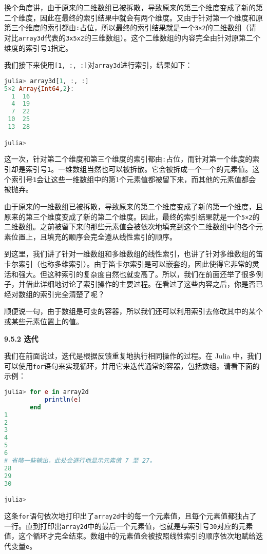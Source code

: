 换个角度讲，由于原来的二维数组已被拆散，导致原来的第三个维度变成了新的第二个维度，因此在最终的索引结果中就会有两个维度。又由于针对第一个维度和原第三个维度的索引都由\verb|:|占位，所以最终的索引结果就是一个\verb|3×2|的二维数组（请对比\verb|array3d|代表的\verb|3x5x2|的三维数组）。这个二维数组的内容完全由针对原第二个维度的索引号\verb|1|指定。

我们接下来使用\verb|[1, :, :]|对\verb|array3d|进行索引，结果如下：

\begin{lstlisting}[language=julia]
julia> array3d[1, :, :]
5×2 Array{Int64,2}:
  1  16
  4  19
  7  22
 10  25
 13  28

julia> 
\end{lstlisting}

这一次，针对第二个维度和第三个维度的索引都由\verb|:|占位，而针对第一个维度的索引却是索引号\verb|1|。一维数组当然也可以被拆散。它会被拆成一个一个的元素值。这个索引号\verb|1|会让这些一维数组中的第1个元素值都被留下来，而其他的元素值都会被抛弃。

由于原来的一维数组已被拆散，导致原来的第二个维度变成了新的第一个维度，且原来的第三个维度变成了新的第二个维度。因此，最终的索引结果就是一个\verb|5×2|的二维数组。之前被留下来的那些元素值会被依次地填充到这个二维数组中的各个元素位置上，且填充的顺序会完全遵从线性索引的顺序。

到这里，我们讲了针对一维数组和多维数组的线性索引，也讲了针对多维数组的笛卡尔索引（也称多维索引）。由于笛卡尔索引是可以嵌套的，因此使得它非常的灵活和强大。但这种索引的复杂度自然也就变高了。所以，我们在前面还举了很多例子，并借此详细地讨论了索引操作的主要过程。在看过了这些内容之后，你是否已经对数组的索引完全清楚了呢？

顺便说一句，由于数组是可变的容器，所以我们还可以利用索引去修改其中的某个或某些元素位置上的值。

\textbf{9.5.2 迭代}

我们在前面说过，迭代是根据反馈重复地执行相同操作的过程。在 Julia 中，我们可以使用\verb|for|语句来实现循环，并用它来迭代通常的容器，包括数组。请看下面的示例：

\begin{lstlisting}[language=julia]
julia> for e in array2d
           println(e)
       end
1
2
3
4
5
6
# 省略一些输出，此处会逐行地显示元素值 7 至 27。
28
29
30

julia> 
\end{lstlisting}

这条\verb|for|语句依次地打印出了\verb|array2d|中的每一个元素值，且每个元素值都独占了一行。直到打印出\verb|array2d|中的最后一个元素值，也就是与索引号\verb|30|对应的元素值，这个循环才完全结束。数组中的元素值会被按照线性索引的顺序依次地赋给迭代变量\verb|e|。

